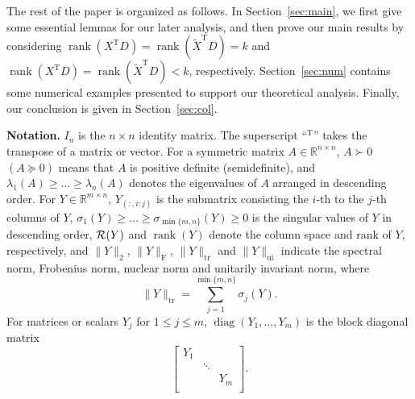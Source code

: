 \documentclass[11pt]{article}
\def\bbR{\mathbb{R}}
\def\cR{{\cal R}}
\DeclareMathOperator{\diag}{diag}
\DeclareMathOperator{\rank}{rank}
\DeclareMathOperator{\tr}{tr}
\DeclareMathOperator{\F}{F}
\DeclareMathOperator{\T}{T}
\DeclareMathOperator{\UI}{ui}
\def\wtd{\widetilde}
\theoremstyle{definition}
\numberwithin{equation}{section}
\numberwithin{figure}{section}
\numberwithin{table}{section}
\begin{document}
The rest of the paper is organized as follows.
In Section~\ref{sec:main}, we first give some essential lemmas for our later analysis,
and then prove our main results by considering $\rank(X^{\T}D)=\rank(\wtd X^{\T}D)=k$
and $\rank(X^{\T}D)=\rank(\wtd X^{\T}D)<k$, respectively.
Section~\ref{sec:num} contains some numerical examples presented to support our theoretical analysis.
Finally, our conclusion is given in Section~\ref{sec:col}.

\textbf{Notation.}
$I_n$ is the $n\times n$ identity matrix. The superscript ``$^{\T}$'' takes the transpose of a matrix or vector.
For a symmetric matrix $A\in\bbR^{n\times n}$, $A\succ 0$ $(A\succeq 0)$ means that $A$ is positive definite (semidefinite),
and $\lambda_1(A)\ge\dots\ge\lambda_n(A)$ denotes the eigenvalues of $A$ arranged in descending order.
For $Y\in\bbR^{m\times n}$, $Y_{ (:,i:j)}$ is the submatrix consisting the $i$-th to the $j$-th columns of $Y$,
$\sigma_1(Y)\ge\dots\ge\sigma_{\min\{m,n\}}(Y)\ge 0$ is the singular values of $Y$ in descending order,
$\cR(Y)$ and $\rank(Y)$ denote the column space and rank of $Y$, respectively,
and $\|Y\|_2$, $\|Y\|_{\F}$, $\|Y\|_{\tr}$ and $\|Y\|_{\UI}$ indicate the spectral norm, Frobenius norm, nuclear norm
and unitarily invariant norm, where
\begin{equation}\label{eq:nc-norm}
\|Y\|_{\tr}=\sum_{j=1}^{\min\{m,n\}}\sigma_j(Y).
\end{equation}
For matrices or scalars $Y_j$ for $1\le j\le m$, $\diag(Y_1,\dots,Y_m)$ is the block diagonal matrix
\[
\begin{bmatrix}
    Y_1 &  &\\
    &   \ddots &\\
    &    & Y_m\\
\end{bmatrix}.
\]
\fi
\end{document}
